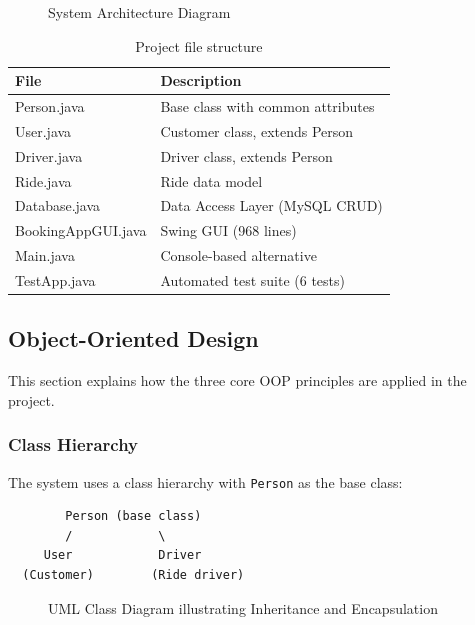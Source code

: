 \documentclass[fonts]{icst}
\begin{document}
\begin{figure}[h!]
    \centering
    \caption{System Architecture Diagram}
    \label{fig:architecture}
\end{figure}

\begin{table}[h!]
\centering
\caption{Project file structure}
\begin{tabular}{|l|l|}
\hline
\textbf{File} & \textbf{Description} \\ \hline
Person.java & Base class with common attributes \\ \hline
User.java & Customer class, extends Person \\ \hline
Driver.java & Driver class, extends Person \\ \hline
Ride.java & Ride data model \\ \hline
Database.java & Data Access Layer (MySQL CRUD) \\ \hline
BookingAppGUI.java & Swing GUI (968 lines) \\ \hline
Main.java & Console-based alternative \\ \hline
TestApp.java & Automated test suite (6 tests) \\ \hline
\end{tabular}
\end{table}


\subsection{Object-Oriented Design}

This section explains how the three core OOP principles are applied in the project.

\subsubsection{Class Hierarchy}

The system uses a class hierarchy with \texttt{Person} as the base class:

\begin{verbatim}
        Person (base class)
        /            \
     User            Driver
  (Customer)        (Ride driver)
\end{verbatim}

\begin{figure}[h!]
    \centering
    \caption{UML Class Diagram illustrating Inheritance and Encapsulation}
    \label{fig:uml}
\end{figure}
\end{document}
